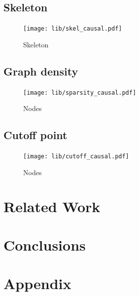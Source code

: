 \documentclass[11pt,a4paper]{report}
\begin{document}
\section{Skeleton}
\begin{figure}
  \centering
  \texttt{[image: lib/skel\_causal.pdf]}
  \caption{Skeleton}
  \label{skel_causal}
\end{figure}

\section{Graph density}
\begin{figure}[h]
  \centering
  \texttt{[image: lib/sparsity\_causal.pdf]}
  \caption{Nodes}
  \label{sparsity_causal}
\end{figure}

\section{Cutoff point}
\begin{figure}
  \centering
  \texttt{[image: lib/cutoff\_causal.pdf]}
  \caption{Nodes}
  \label{cutoff_causal}
\end{figure}

\chapter{Related Work}\label{relatedwork}

\chapter{Conclusions}\label{conclusions}

\printbibliography

\appendix

\chapter{Appendix}\label{appendix}
\end{document}
